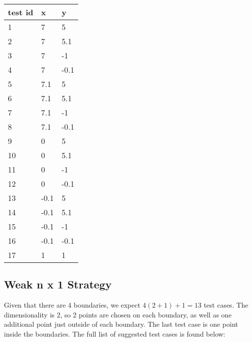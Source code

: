 \documentclass[letterpaper]{article}
\begin{document}
\begin{adjustbox}{center}
	\begin{tabular}{lll}
		test id & x    & y    \\ \hline
		1       & 7    & 5    \\
		2       & 7    & 5.1  \\
		3       & 7    & -1   \\
		4       & 7    & -0.1 \\
		5       & 7.1  & 5    \\
		6       & 7.1  & 5.1  \\
		7       & 7.1  & -1   \\
		8       & 7.1  & -0.1 \\
		9       & 0    & 5    \\
		10      & 0    & 5.1  \\
		11      & 0    & -1   \\
		12      & 0    & -0.1 \\
		13      & -0.1 & 5    \\
		14      & -0.1 & 5.1  \\
		15      & -0.1 & -1   \\
		16      & -0.1 & -0.1 \\
		17      & 1    & 1    \\
	\end{tabular}
\end{adjustbox}

\subsection{Weak n x 1 Strategy}
Given that there are 4 boundaries, we expect $4(2+1) +1 = 13$ test cases.
The dimensionality is 2, so 2 points are chosen on each boundary, as well
as one additional point just outside of each boundary. The last test case
is one point inside the boundaries. The full list of suggested test cases
is found below:
\end{document}
